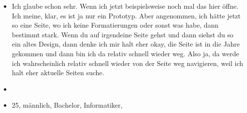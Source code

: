 {\begin{itemize}[]
            \item {} Ich glaube schon sehr.
                  Wenn ich jetzt beispielsweise noch mal das hier öffne.
                  Ich meine, klar, es ist ja nur ein Prototyp.
                  Aber angenommen, ich hätte jetzt so eine Seite, wo ich keine Formatierungen oder sonst was habe, dann bestimmt stark.
                  Wenn du auf irgendeine Seite gehst und dann siehst du so ein altes Design, dann denke ich mir halt eher okay, die Seite ist in die Jahre gekommen und dann bin ich da relativ schnell wieder weg.
                  Also ja, da werde ich wahrscheinlich relativ schnell wieder von der Seite weg navigieren, weil ich halt eher aktuelle Seiten suche.
            \item {}
            \item {} 25, männlich, Bachelor, Informatiker,
      \end{itemize}}
\nolinenumbers
